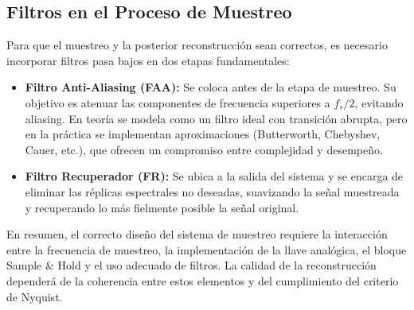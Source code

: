 \subsection{Filtros en el Proceso de Muestreo}
Para que el muestreo y la posterior reconstrucción sean correctos, es necesario incorporar filtros pasa bajos en dos etapas fundamentales:

\begin{itemize}
    \item \textbf{Filtro Anti-Aliasing (FAA):} Se coloca antes de la etapa de muestreo. Su objetivo es atenuar las componentes de frecuencia superiores a $f_s/2$, evitando aliasing. En teoría se modela como un filtro ideal con transición abrupta, pero en la práctica se implementan aproximaciones (Butterworth, Chebyshev, Cauer, etc.), que ofrecen un compromiso entre complejidad y desempeño.
    
    \item \textbf{Filtro Recuperador (FR):} Se ubica a la salida del sistema y se encarga de eliminar las réplicas espectrales no deseadas, suavizando la señal muestreada y recuperando lo más fielmente posible la señal original.
\end{itemize}

En resumen, el correcto diseño del sistema de muestreo requiere la interacción entre la frecuencia de muestreo, la implementación de la llave analógica, el bloque Sample \& Hold y el uso adecuado de filtros. La calidad de la reconstrucción dependerá de la coherencia entre estos elementos y del cumplimiento del criterio de Nyquist.
